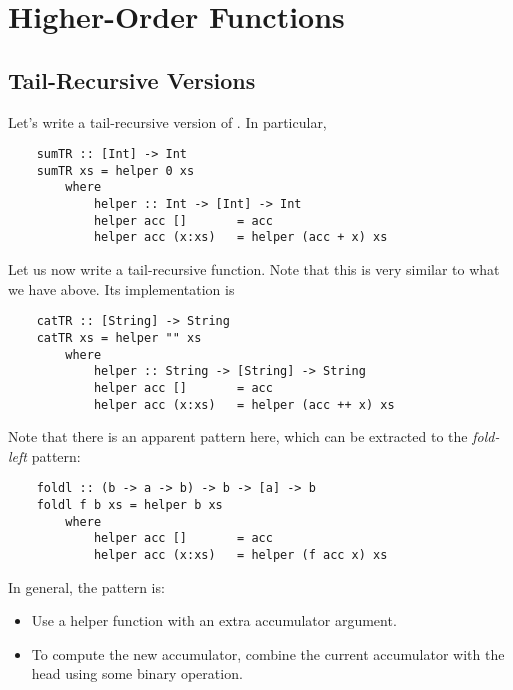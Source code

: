 \documentclass[letterpaper]{article}
\begin{document}
\section{Higher-Order Functions}
\subsection{Tail-Recursive Versions}
Let's write a tail-recursive version of . In particular,
\begin{verbatim}
    sumTR :: [Int] -> Int 
    sumTR xs = helper 0 xs 
        where 
            helper :: Int -> [Int] -> Int 
            helper acc []       = acc 
            helper acc (x:xs)   = helper (acc + x) xs \end{verbatim}

Let us now write a tail-recursive  function. Note that this is very similar to what we have above. Its implementation is
\begin{verbatim}
    catTR :: [String] -> String 
    catTR xs = helper "" xs 
        where 
            helper :: String -> [String] -> String 
            helper acc []       = acc 
            helper acc (x:xs)   = helper (acc ++ x) xs \end{verbatim}

Note that there is an apparent pattern here, which can be extracted to the \emph{fold-left} pattern: 
\begin{verbatim}
    foldl :: (b -> a -> b) -> b -> [a] -> b
    foldl f b xs = helper b xs 
        where 
            helper acc []       = acc 
            helper acc (x:xs)   = helper (f acc x) xs \end{verbatim}
In general, the pattern is: 
\begin{itemize}
    \item Use a helper function with an extra accumulator argument.
    \item To compute the new accumulator, combine the current accumulator with the head using some binary operation.
\end{itemize}
\end{document}
